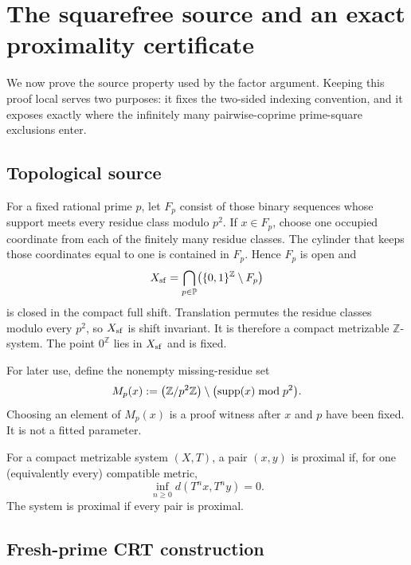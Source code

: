 \section{The squarefree source and an exact proximality certificate}
\label{sec:source-proximality}

We now prove the source property used by the factor argument.  Keeping this
proof local serves two purposes: it fixes the two-sided indexing convention,
and it exposes exactly where the infinitely many pairwise-coprime
prime-square exclusions enter.

\subsection{Topological source}

For a fixed rational prime \(p\), let \(F_p\) consist of those binary
sequences whose support meets every residue class modulo \(p^2\).  If
\(x\in F_p\), choose one occupied coordinate from each of the finitely many
residue classes.  The cylinder that keeps those coordinates equal to one is
contained in \(F_p\).  Hence \(F_p\) is open and
\[
  X_{\mathrm{sf}}=\bigcap_{p\in\mathbb P}
  \bigl(\{0,1\}^{\mathbb Z}\setminus F_p\bigr)
\]
is closed in the compact full shift.  Translation permutes the residue
classes modulo every \(p^2\), so \(X_{\mathrm{sf}}\) is shift invariant.  It is
therefore a compact metrizable \(\mathbb Z\)-system.  The point
\(0^{\mathbb Z}\) lies in \(X_{\mathrm{sf}}\) and is fixed.

For later use, define the nonempty missing-residue set
\begin{equation}
  M_p(x):=
  \left(\mathbb Z/p^2\mathbb Z\right)
  \setminus\bigl(\operatorname{supp}(x)\bmod p^2\bigr).
  \label{eq:missing-residue}
\end{equation}
Choosing an element of \(M_p(x)\) is a proof witness after \(x\) and \(p\)
have been fixed.  It is not a fitted parameter.

\begin{definition}
For a compact metrizable system \((X,T)\), a pair \((x,y)\) is proximal if,
for one (equivalently every) compatible metric,
\[
  \inf_{n\geq0}d(T^n x,T^n y)=0.
\]
The system is proximal if every pair is proximal.
\end{definition}

\subsection{Fresh-prime CRT construction}

